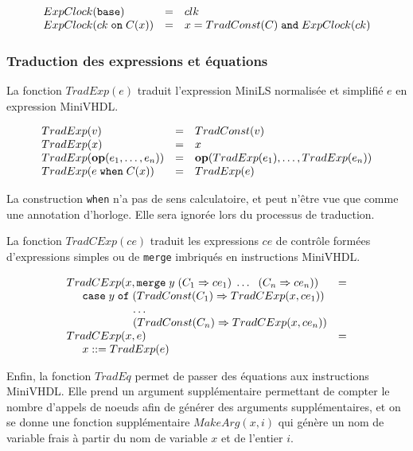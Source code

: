 \documentclass[a4paper]{article}
\newcommand{\mybox}[1]{\mbox{\tt{#1}}}
\newcommand{\ind}[0]{\hspace{0.5cm}}
\newcommand{\coloneqq}[0]{::=}
\newcommand{\Op}[2]{\mybox{\bf{op}}(#1,\dots,#2)}
\newcommand{\When}[3]{#1 \; \mybox{when} \; #2(#3)}
\newcommand{\Merge}[5]{\mybox{merge} \; #1 \; (#2 \Rightarrow #3) \; \dots \; \
  (#4 \Rightarrow #5)}
\newcommand{\Base}[0]{\mybox{base}}
\newcommand{\On}[3]{#1 \; \mybox{on} \; #2 (#3)}
\newcommand{\Affect}[2]{#1 \coloneqq #2}
\begin{document}
\[
\begin{array}{lcl}
  \EC{\Base} & = & clk \\
  \EC{\On{ck}{C}{x}} & = & x = \TradC{C} \; \mathtt{and} \; \EC{ck}
\end{array}
\]

\subsubsection{Traduction des expressions et \'equations}

La fonction $TradExp(e)$ traduit l'expression MiniLS normalis\'ee et
simplifi\'e $e$ en expression MiniVHDL.

\newcommand{\TradE}[1]{TradExp(#1)}

\[
\begin{array}{lcl}
  \TradE{v} & = & \TradC{v} \\
  \TradE{x} & = & x \\
  \TradE{\Op{e_1}{e_n}} & = & \Op{\TradE{e_1}}{\TradE{e_n}} \\
  \TradE{\When{e}{C}{x}} & = & \TradE{e}
\end{array}
\]

La construction \texttt{when} n'a pas de sens calculatoire, et peut n'être vue
que comme une annotation d'horloge. Elle sera ignorée lors du processus de
traduction.

La fonction $TradCExp(ce)$ traduit les expressions $ce$ de contr\^ole form\'ees
d'expressions simples ou de \texttt{merge} imbriqu\'es en instructions MiniVHDL.

\newcommand{\TradCE}[2]{TradCExp(#1, #2)}

\[
\begin{array}{ll}
  \TradCE{x}{\Merge{y}{C_1}{ce_1}{C_n}{ce_n}} & = \\
  \ind \mathtt{case} \; y \; \mathtt{of} \;
  (\TradC{C_1} \Rightarrow \TradCE{x}{ce_1}) \\
  \hspace{2.1cm} \dots \\
  \hspace{2.1cm} (\TradC{C_n} \Rightarrow \TradCE{x}{ce_n}) \\
  \TradCE{x}{e} & = \\
  \ind \Affect{x}{\TradE{e}}
\end{array}
\]

Enfin, la fonction $TradEq$ permet de passer des \'equations aux instructions
MiniVHDL. Elle prend un argument suppl\'ementaire permettant de compter le nombre
d'appels de noeuds afin de g\'en\'erer des arguments suppl\'ementaires, et on se donne
une fonction suppl\'ementaire $MakeArg(x,i)$ qui g\'en\`ere un nom de variable frais \`a
partir du nom de variable $x$ et de l'entier $i$.
\end{document}
